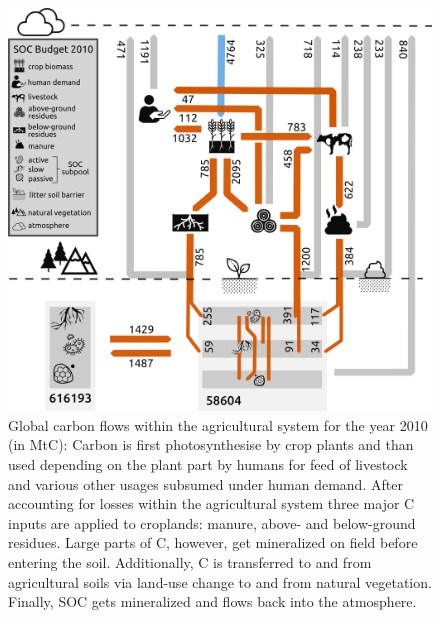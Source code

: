 \documentclass[gc, manuscript]{copernicus}
\begin{document}
\begin{figure}[h]
\includegraphics[width=16cm]{../ResultNotebooks/Output/Images/CarbonBudget} \caption{Global carbon flows within the agricultural system for the year 2010 (in MtC): Carbon is first photosynthesise by crop plants and than used depending on the plant part by humans for feed of livestock and various other usages subsumed under human demand. After accounting for losses within the agricultural system three major C inputs are applied to croplands: manure, above- and below-ground residues. Large parts of C, however, get mineralized on field before entering the soil. Additionally, C is transferred to and from agricultural soils via land-use change to and from natural vegetation. Finally, SOC gets mineralized and flows back into the atmosphere.}\label{fig:FlowFig}
\end{figure}
\end{document}
